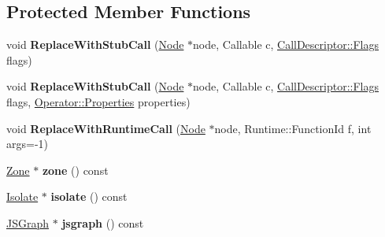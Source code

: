 \subsection*{Protected Member Functions}
\begin{DoxyCompactItemize}
\item 
void {\bfseries Replace\+With\+Stub\+Call} (\hyperlink{classv8_1_1internal_1_1compiler_1_1_node}{Node} $\ast$node, Callable c, \hyperlink{classv8_1_1base_1_1_flags}{Call\+Descriptor\+::\+Flags} flags)\hypertarget{classv8_1_1internal_1_1compiler_1_1_j_s_generic_lowering_acb812a927897d9aee2d5fa42ad8425ad}{}\label{classv8_1_1internal_1_1compiler_1_1_j_s_generic_lowering_acb812a927897d9aee2d5fa42ad8425ad}

\item 
void {\bfseries Replace\+With\+Stub\+Call} (\hyperlink{classv8_1_1internal_1_1compiler_1_1_node}{Node} $\ast$node, Callable c, \hyperlink{classv8_1_1base_1_1_flags}{Call\+Descriptor\+::\+Flags} flags, \hyperlink{classv8_1_1base_1_1_flags}{Operator\+::\+Properties} properties)\hypertarget{classv8_1_1internal_1_1compiler_1_1_j_s_generic_lowering_ab20b9e1e963628ad051e12300d278f98}{}\label{classv8_1_1internal_1_1compiler_1_1_j_s_generic_lowering_ab20b9e1e963628ad051e12300d278f98}

\item 
void {\bfseries Replace\+With\+Runtime\+Call} (\hyperlink{classv8_1_1internal_1_1compiler_1_1_node}{Node} $\ast$node, Runtime\+::\+Function\+Id f, int args=-\/1)\hypertarget{classv8_1_1internal_1_1compiler_1_1_j_s_generic_lowering_a39abc5ee3c04bde1be94d223e467aa2e}{}\label{classv8_1_1internal_1_1compiler_1_1_j_s_generic_lowering_a39abc5ee3c04bde1be94d223e467aa2e}

\item 
\hyperlink{classv8_1_1internal_1_1_zone}{Zone} $\ast$ {\bfseries zone} () const \hypertarget{classv8_1_1internal_1_1compiler_1_1_j_s_generic_lowering_a74f065b2f9ac548b1e2b62c757225202}{}\label{classv8_1_1internal_1_1compiler_1_1_j_s_generic_lowering_a74f065b2f9ac548b1e2b62c757225202}

\item 
\hyperlink{classv8_1_1internal_1_1_isolate}{Isolate} $\ast$ {\bfseries isolate} () const \hypertarget{classv8_1_1internal_1_1compiler_1_1_j_s_generic_lowering_a8ede0bb9c64f044cda80bc0cb7ae4cbd}{}\label{classv8_1_1internal_1_1compiler_1_1_j_s_generic_lowering_a8ede0bb9c64f044cda80bc0cb7ae4cbd}

\item 
\hyperlink{classv8_1_1internal_1_1compiler_1_1_j_s_graph}{J\+S\+Graph} $\ast$ {\bfseries jsgraph} () const \hypertarget{classv8_1_1internal_1_1compiler_1_1_j_s_generic_lowering_aec8155f4af56b9a4ace5a86925816993}{}\label{classv8_1_1internal_1_1compiler_1_1_j_s_generic_lowering_aec8155f4af56b9a4ace5a86925816993}


\end{DoxyCompactItemize}
